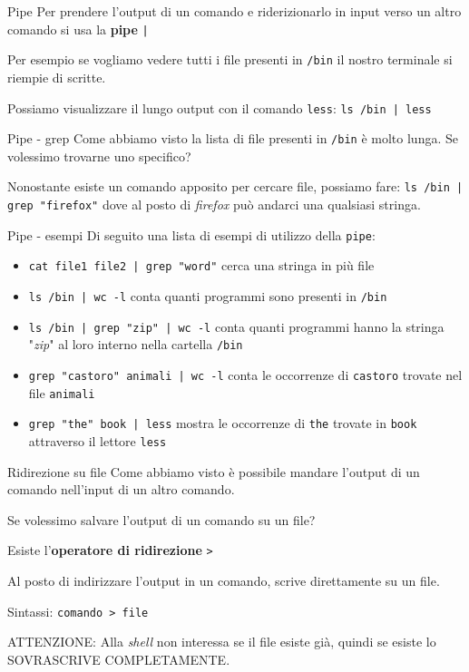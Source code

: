\documentclass{beamer}
\begin{document}
\begin{frame}{Pipe}
  Per prendere l'output di un comando e riderizionarlo in input verso un altro
  comando si usa la \textbf{pipe} \texttt{|}\bigskip

  Per esempio se vogliamo vedere tutti i file presenti in \texttt{/bin} il 
  nostro terminale si riempie di scritte.\bigskip

  Possiamo visualizzare il lungo output con il comando \texttt{less}: 
  \texttt{ls /bin | less}
\end{frame}

\begin{frame}{Pipe - grep}
  Come abbiamo visto la lista di file presenti in \texttt{/bin} è molto lunga.
  Se volessimo trovarne uno specifico?\pause \bigskip

  Nonostante esiste un comando apposito per cercare file, possiamo fare:
  \texttt{ls /bin | grep "firefox"} dove al posto di \textit{firefox} può 
  andarci una qualsiasi stringa.
\end{frame}

\begin{frame}{Pipe - esempi}
  Di seguito una lista di esempi di utilizzo della \texttt{pipe}:
  \begin{itemize}
    \item \texttt{cat file1 file2 | grep "word"} cerca una stringa in più file
    \item \texttt{ls /bin | wc -l} conta quanti programmi sono presenti in 
      \texttt{/bin}
    \item \texttt{ls /bin | grep "zip" | wc -l} conta quanti programmi hanno
      la stringa "\textit{zip}" al loro interno nella cartella \texttt{/bin}
    \item \texttt{grep "castoro" animali | wc -l} conta le occorrenze di 
      \texttt{castoro} trovate nel file \texttt{animali}
    \item \texttt{grep "the" book | less} mostra le occorrenze di \texttt{the} 
      trovate in \texttt{book} attraverso il lettore \texttt{less}
  \end{itemize}
\end{frame}

\begin{frame}{Ridirezione su file}
  Come abbiamo visto è possibile mandare l'output di un comando nell'input di
  un altro comando.\bigskip

  Se volessimo salvare l'output di un comando su un file?\pause

  Esiste l'\textbf{operatore di ridirezione} \texttt{>}\bigskip

  Al posto di indirizzare l'output in un comando, scrive direttamente su un
  file.\bigskip

  Sintassi: \texttt{comando > file}\bigskip

  ATTENZIONE: Alla \textit{shell} non interessa se il file esiste già, quindi se 
  esiste lo SOVRASCRIVE COMPLETAMENTE.
\end{frame}
\end{document}
